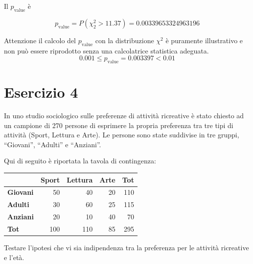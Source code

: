 \documentclass[
  11pt,
]{book}
\theoremstyle{mytheoremstyle}
\theoremstyle{mydefstyle}
\newenvironment{sol}
  {
  \begin{tcolorbox}[enhanced,breakable,arc=0.1mm,boxrule=1pt,colback=white,colframe=iblue,
  title=\bf \fontfamily{lmss}\selectfont \hspace{.5 cm} Soluzione,drop fuzzy shadow]

}{
\end{tcolorbox}
  }
\begin{document}
\begin{sol}
Il \(p_{\text{value}}\) è

\[ p_{\text{value}} = P(\chi^2_{2}>11.37)=0.00339653324963196 \]

Attenzione il calcolo del \(p_\text{value}\) con la distribuzione \(\chi^2\) è puramente illustrativo e non può essere riprodotto senza una calcolatrice statistica adeguata.\[
 0.001 \leq p_\text{value}= 0.003397 < 0.01 
\]

\end{sol}

\section{Esercizio 4}\label{esercizio-4-1}

In uno studio sociologico sulle preferenze di attività ricreative è stato chiesto ad un campione di 270 persone di esprimere la propria preferenza tra tre tipi di attività (Sport, Lettura e Arte). Le persone sono state suddivise in tre gruppi, ``Giovani'', ``Adulti'' e ``Anziani''.

Qui di seguito è riportata la tavola di contingenza:

\begin{table}[H]
\centering
\begin{tabular}{>{}lrrrr}
\toprule
  & Sport & Lettura & Arte & Tot\\
\midrule
\textbf{Giovani} & 50 & 40 & 20 & 110\\
\textbf{Adulti} & 30 & 60 & 25 & 115\\
\textbf{Anziani} & 20 & 10 & 40 & 70\\
\textbf{Tot} & 100 & 110 & 85 & 295\\
\bottomrule
\end{tabular}
\end{table}

Testare l'ipotesi che vi sia indipendenza tra la preferenza per le attività ricreative e l'età.
\end{document}
